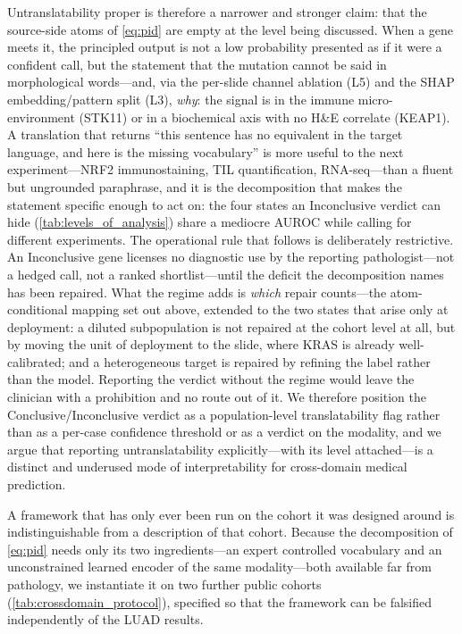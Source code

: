 Untranslatability proper is therefore a narrower and stronger claim:
that the source-side atoms of \cref{eq:pid} are empty at the level
being discussed.
When a gene meets it, the principled output is not a low probability
presented as if it were a confident call, but the statement that the
mutation cannot be said in morphological words---and, via the
per-slide channel ablation (L5) and the SHAP embedding/pattern split
(L3), \emph{why}: the signal is in the immune micro-environment
(STK11) or in a biochemical axis with no H\&E correlate (KEAP1).
A translation that returns ``this sentence has no equivalent in the
target language, and here is the missing vocabulary'' is more useful
to the next experiment---NRF2 immunostaining, TIL quantification,
RNA-seq---than a fluent but ungrounded paraphrase, and it is the
decomposition that makes the statement specific enough to act on:
the four states an Inconclusive verdict can hide
(\cref{tab:levels_of_analysis}) share a mediocre AUROC while calling for
different experiments.
The operational rule that follows is deliberately restrictive. An
Inconclusive gene licenses no diagnostic use by the reporting
pathologist---not a hedged call, not a ranked shortlist---until the
deficit the decomposition names has been repaired. What the regime adds
is \emph{which} repair counts---the atom-conditional mapping set out
above, extended to the two states that arise only at deployment: a
diluted subpopulation is not repaired at the cohort level at all, but by
moving the unit of deployment to the slide, where KRAS is already
well-calibrated; and a heterogeneous target is repaired by refining the
label rather than the model. Reporting the verdict without the regime
would leave the clinician with a prohibition and no route out of it.
We therefore position the Conclusive/Inconclusive verdict as a
population-level translatability flag rather than as a per-case
confidence threshold or as a verdict on the modality, and we argue
that reporting untranslatability explicitly---with its level
attached---is a distinct and underused mode of interpretability for
cross-domain medical prediction.

A framework that has only ever been run on the cohort it was designed
around is indistinguishable from a description of that cohort.
Because the decomposition of \cref{eq:pid} needs only its two
ingredients---an expert controlled vocabulary and an unconstrained learned
encoder of the same modality---both available far from pathology, we
instantiate it on two further public cohorts
(\cref{tab:crossdomain_protocol}), specified so that the framework can be
falsified independently of the LUAD results.

